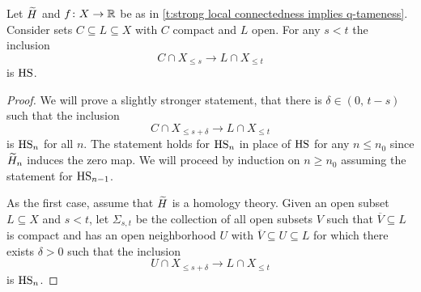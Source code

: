 \begin{lem} \label{l:key lemma for q-tameness}
    Let $\widetilde{H}$ and $f \colon X \to \mathbb{R}$ be as in \cref{t:strong local connectedness implies q-tameness}.
	Consider sets $C \subseteq L \subseteq X$ with $C$ compact and $L$ open.
	For any $s < t$ the inclusion
	\[C \cap X_{\leq s} \to L \cap X_{\leq t}\]
	is $\mathrm{HS}$.
\end{lem}

\begin{proof}
	We will prove a slightly stronger statement,
	that there is $\delta \in (0,\, t-s)$ such that the inclusion
	\[C \cap X_{\leq s+\delta} \to L \cap X_{\leq t}\]
	is $\mathrm{HS}_n$ for all $n$.
	The statement holds for $\mathrm{HS}_{n}$ in place of $\mathrm{HS}$ for any $n \leq n_0$ since $\widetilde{H}_{n}$ induces the zero map.
	We will proceed by induction on $n \geq n_0$
	assuming the statement for $\mathrm{HS}_{n-1}$. 
	
	As the first case, assume that $\widetilde{H}$ is a homology theory. Given an open subset $L \subseteq X$ and $s < t$, let $\Sigma_{s, t}$ be the collection of all 
    open subsets $V$ such that $\overline{V} \subseteq L$ is compact and
    has an open neighborhood $U$ with $\overline{V} \subseteq U \subseteq L$ 
    for which there exists $\delta > 0$ such that
    the inclusion
    \[U \cap X_{\leq s+\delta} \to L \cap X_{\leq t}\]
	is $\mathrm{HS}_n$.
	
	

\end{proof}
